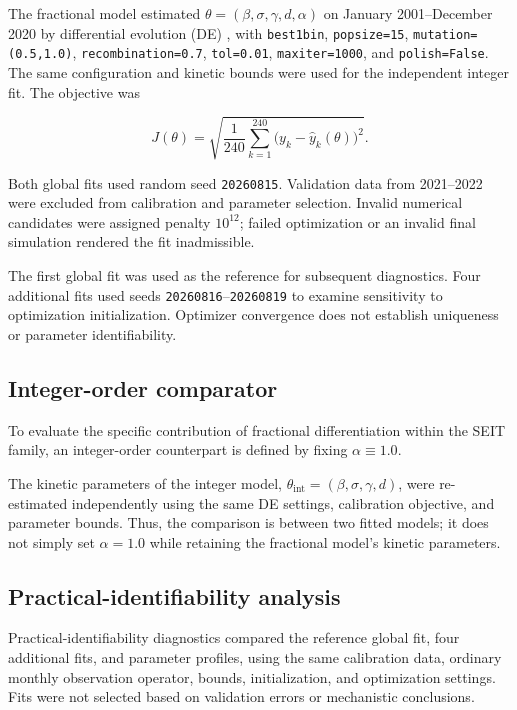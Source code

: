 \documentclass[pdflatex,sn-mathphys-ay]{sn-jnl}
\begin{document}
The fractional model estimated $\theta=(\beta,\sigma,\gamma,d,\alpha)$ on January 2001--December 2020 by differential evolution (DE) \citep{storn1997}, with \texttt{best1bin}, \texttt{popsize=15}, \texttt{mutation=(0.5,1.0)}, \texttt{recombination=0.7}, \texttt{tol=0.01}, \texttt{maxiter=1000}, and \texttt{polish=False}. The same configuration and kinetic bounds were used for the independent integer fit. The objective was

\[
J(\theta)=\sqrt{\frac{1}{240}\sum_{k=1}^{240}\bigl(y_k-\widehat y_k(\theta)\bigr)^2}.
\]

Both global fits used random seed \texttt{20260815}. Validation data from 2021--2022 were excluded from calibration and parameter selection. Invalid numerical candidates were assigned penalty $10^{12}$; failed optimization or an invalid final simulation rendered the fit inadmissible.

The first global fit was used as the reference for subsequent diagnostics. Four additional fits used seeds \texttt{20260816}--\texttt{20260819} to examine sensitivity to optimization initialization. Optimizer convergence does not establish uniqueness or parameter identifiability.

\subsection{Integer-order comparator}

To evaluate the specific contribution of fractional differentiation within the SEIT family, an integer-order counterpart is defined by fixing $\alpha \equiv 1.0$.

The kinetic parameters of the integer model, $\theta_{\text{int}}=(\beta,\sigma,\gamma,d)$, were re-estimated independently using the same DE settings, calibration objective, and parameter bounds. Thus, the comparison is between two fitted models; it does not simply set $\alpha=1.0$ while retaining the fractional model's kinetic parameters.

\subsection{Practical-identifiability analysis}

Practical-identifiability diagnostics compared the reference global fit, four additional fits, and parameter profiles, using the same calibration data, ordinary monthly observation operator, bounds, initialization, and optimization settings. Fits were not selected based on validation errors or mechanistic conclusions.
\end{document}
